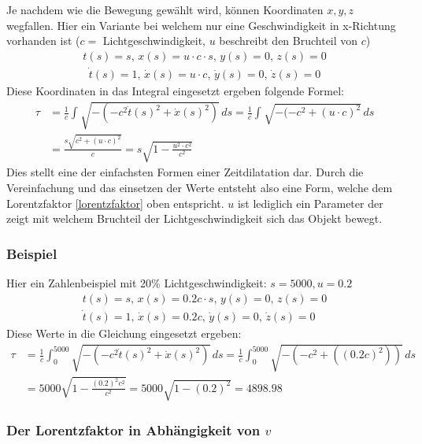 \begin{refsection}
Je nachdem wie die Bewegung gew\"ahlt wird, können Koordinaten $x, y, z$ wegfallen.
Hier ein Variante bei welchem nur eine Geschwindigkeit in x-Richtung vorhanden ist ($c =$ Lichtgeschwindigkeit, $u$ beschreibt den Bruchteil von $c$)
\begin{align*}
     t(s)= s,\,
 	 x(s)=u\cdot c \cdot s,\,
     y(s)=0,\,
     z(s)=0 
\end{align*}
\begin{align*}
     \dot{t}(s)=1,\,
     \dot{x}(s)=u\cdot c,\,
     \dot{y}(s)=0,\,
     \dot{z}(s)=0
\end{align*}
Diese Koordinaten in das Integral eingesetzt ergeben folgende Formel:
\begin{align*}
\tau
&=
\frac{1}{c}\int_{}^{}\sqrt{-(-c^2\dot{t}(s)^2+\dot{x}(s)^2)}\,ds 
=
\frac{1}{c}\int_{}^{}\sqrt{-(-c^2 +(u\cdot c)^{2}}\,ds\\
&=
\frac{s\sqrt{c^2+(u\cdot c)^{2}}}{c} 
=
s\sqrt{1-\frac{u^2\cdot c^2}{c^2}}
\end{align*}
Dies stellt eine der einfachsten Formen einer Zeitdilatation dar. Durch die Vereinfachung und das einsetzen der Werte entsteht also eine Form, welche dem Lorentzfaktor \eqref{lorentzfaktor} oben entspricht.
$u$ ist lediglich ein Parameter der zeigt mit welchem Bruchteil der Lichtgeschwindigkeit sich das Objekt bewegt.

\subsubsection{Beispiel}

Hier ein Zahlenbeispiel mit 20\% Lichtgeschwindigkeit:
$s=5000, u=0.2$ 
\begin{align*}
    t(s)=s,\,
    x(s)=0.2c \cdot s,\,
    y(s)=0,\,
    z(s)=0 
    \\
    \dot{t}(s)=1,\,
    \dot{x}(s)=0.2c,\,
    \dot{y}(s)=0,\,
    \dot{z}(s)=0
\end{align*}
Diese Werte in die Gleichung eingesetzt ergeben:
\begin{align*}
 \tau
&=
\frac{1}{c}\int_{0}^{5000}\sqrt{-(-c^2\dot{t}(s)^2+\dot{x}(s)^2)}\,ds
=
\frac{1}{c}\int_{0}^{5000}\sqrt{-(-c^2+((0.2c)^2))}\,ds\\
&=
5000\sqrt{1-\frac{(0.2)^2 c^2}{c^2}} 
=
5000\sqrt{1-(0.2)^2}
=
4898.98
\end{align*}

\subsubsection{Der Lorentzfaktor in Abhängigkeit von $v$}


\end{refsection}
